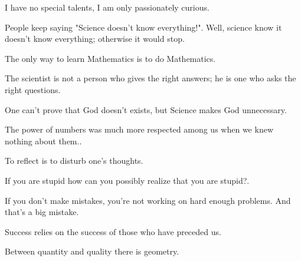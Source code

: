  	\begin{fquote}I have no special talents, I am only passionately curious.
 	\end{fquote}

	\begin{fquote}People keep saying "Science doesn't know everything!". Well, science know it doesn't know everything; otherwise it would stop.
 	\end{fquote}
 	
 	\begin{fquote}The only way to learn Mathematics is to do Mathematics.
 	\end{fquote}

	\begin{fquote}The scientist is not a person who gives the right answers; he is one who asks the right questions.
 	\end{fquote}
 	
	\begin{fquote}One can't prove that God doesn't exists, but Science makes God unnecessary.
 	\end{fquote}

 	 \begin{fquote}[Voltaire]The power of numbers was much more respected among us when we knew nothing about them..
 	\end{fquote}

	\begin{fquote}To reflect is to disturb one's thoughts.
 	\end{fquote} 
 	
 	\begin{fquote}If you are stupid how can you possibly realize that you are stupid?.
 	\end{fquote} 	
 	
 	\begin{fquote}If you don't make mistakes, you're not working on hard enough problems. And that's a big mistake.
 	\end{fquote}

	\begin{fquote}Success relies on the success of those who have preceded us.
 	\end{fquote}
 	
 	\begin{fquote}Between quantity and quality there is geometry.
 	\end{fquote}


